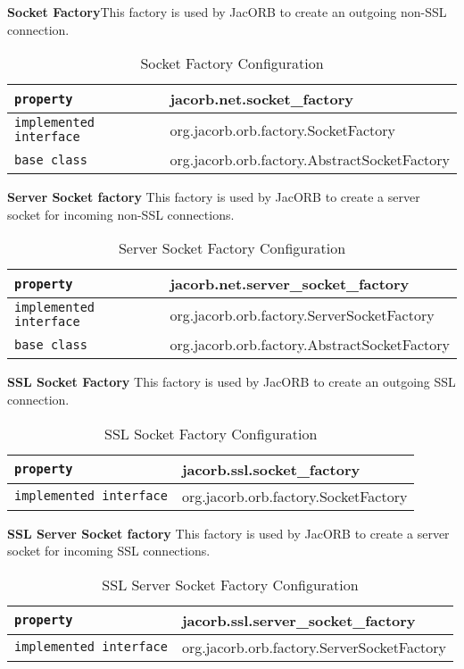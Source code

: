 \textbf{Socket Factory}This factory is used by JacORB to create an outgoing non-SSL connection.
\begin{small}
\begin{longtable}{|p{5cm}|p{7.5cm}|}
\caption{Socket Factory Configuration}\\
\hline
\verb"property" & jacorb.net.socket\_factory\\
\hline
\verb"implemented interface" & org.jacorb.orb.factory.SocketFactory\\
\hline
\verb"base class" & org.jacorb.orb.factory.AbstractSocketFactory\\
\hline
\end{longtable}
\end{small}

\textbf{Server Socket factory}
This factory is used by JacORB to create a server socket for incoming non-SSL connections.
\begin{small}
\begin{longtable}{|p{5cm}|p{7.5cm}|}
\caption{Server Socket Factory Configuration}\\
\hline
\verb"property" & jacorb.net.server\_socket\_factory\\
\hline
\verb"implemented interface" & org.jacorb.orb.factory.ServerSocketFactory\\
\hline
\verb"base class" & org.jacorb.orb.factory.AbstractSocketFactory\\
\hline
\end{longtable}
\end{small}

\textbf{SSL Socket Factory}
This factory is used by JacORB to create an outgoing SSL connection.
\begin{small}
\begin{longtable}{|p{5cm}|p{7.5cm}|}
\caption{SSL Socket Factory Configuration}\\
\hline
\verb"property" & jacorb.ssl.socket\_factory\\
\hline
\verb"implemented interface" & org.jacorb.orb.factory.SocketFactory\\
\hline
\end{longtable}
\end{small}

\pagebreak
\textbf{SSL Server Socket factory}
This factory is used by JacORB to create a server socket for incoming SSL connections.
\begin{small}
\begin{longtable}{|p{5cm}|p{7.5cm}|}
\caption{SSL Server Socket Factory Configuration}\\
\hline
\verb"property" & jacorb.ssl.server\_socket\_factory\\
\hline
\verb"implemented interface" & org.jacorb.orb.factory.ServerSocketFactory\\
\hline
\end{longtable}
\end{small}

